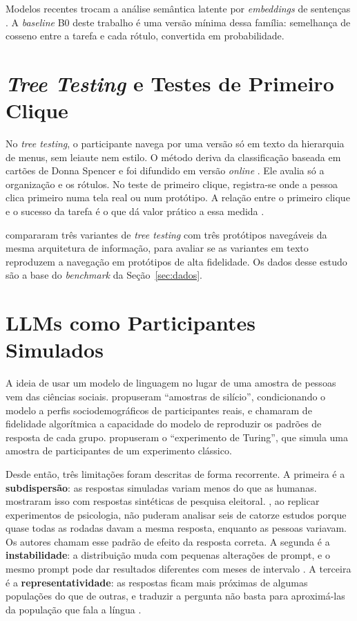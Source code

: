 \documentclass[12pt,oneside,a4paper,chapter=TITLE,english,brazil]{abntex2}
\begin{document}
Modelos recentes trocam a análise semântica latente por \textit{embeddings} de sentenças \cite{reimers2019sbert,jin2026scent}. A \textit{baseline} B0 deste trabalho é uma versão mínima dessa família: semelhança de cosseno entre a tarefa e cada rótulo, convertida em probabilidade.

\section{\textit{Tree Testing} e Testes de Primeiro Clique}
\label{sec:treetesting}

No \textit{tree testing}, o participante navega por uma versão só em texto da hierarquia de menus, sem leiaute nem estilo. O método deriva da classificação baseada em cartões de Donna Spencer e foi difundido em versão \textit{online} \cite{obrien2009treetesting}. Ele avalia só a organização e os rótulos. No teste de primeiro clique, registra-se onde a pessoa clica primeiro numa tela real ou num protótipo. A relação entre o primeiro clique e o sucesso da tarefa é o que dá valor prático a essa medida \cite{bailey2009firstclick}.

 compararam três variantes de \textit{tree testing} com três protótipos navegáveis da mesma arquitetura de informação, para avaliar se as variantes em texto reproduzem a navegação em protótipos de alta fidelidade. Os dados desse estudo são a base do \textit{benchmark} da Seção~\ref{sec:dados}.

\section{LLMs como Participantes Simulados}
\label{sec:llmsim}

A ideia de usar um modelo de linguagem no lugar de uma amostra de pessoas vem das ciências sociais.  propuseram ``amostras de silício'', condicionando o modelo a perfis sociodemográficos de participantes reais, e chamaram de fidelidade algorítmica a capacidade do modelo de reproduzir os padrões de resposta de cada grupo.  propuseram o ``experimento de Turing'', que simula uma amostra de participantes de um experimento clássico.

Desde então, três limitações foram descritas de forma recorrente. A primeira é a \textbf{subdispersão}: as respostas simuladas variam menos do que as humanas.  mostraram isso com respostas sintéticas de pesquisa eleitoral. , ao replicar experimentos de psicologia, não puderam analisar seis de catorze estudos porque quase todas as rodadas davam a mesma resposta, enquanto as pessoas variavam. Os autores chamam esse padrão de efeito da resposta correta. A segunda é a \textbf{instabilidade}: a distribuição muda com pequenas alterações de prompt, e o mesmo prompt pode dar resultados diferentes com meses de intervalo \cite{bisbee2024synthetic}. A terceira é a \textbf{representatividade}: as respostas ficam mais próximas de algumas populações do que de outras, e traduzir a pergunta não basta para aproximá-las da população que fala a língua \cite{santurkar2023whose,durmus2023globalopinions}.
\end{document}
